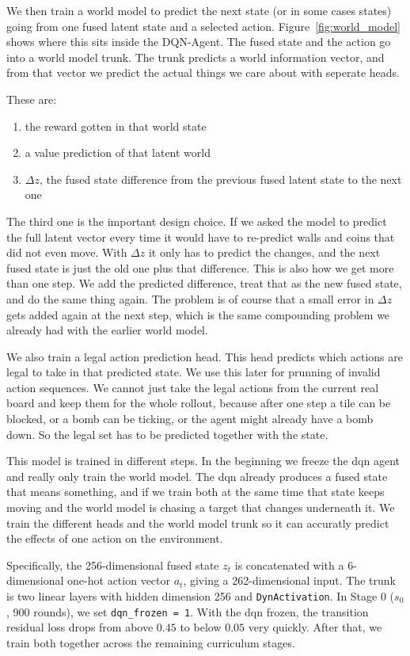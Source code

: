 \documentclass[article, 10pt]{IEEEtran}
\begin{document}
We then train a world model to predict the next state (or in some cases states) going from one fused latent state and a selected action. Figure~\ref{fig:world_model} shows where this sits inside the DQN-Agent. The fused state and the action go into a world model trunk. The trunk predicts a world information vector, and from that vector we predict the actual things we care about with seperate heads.

These are:
\begin{enumerate}
    \item the reward gotten in that world state
    \item a value prediction of that latent world
    \item $\Delta z$, the fused state difference from the previous fused latent state to the next one
\end{enumerate}

The third one is the important design choice. If we asked the model to predict the full latent vector every time it would have to re-predict walls and coins that did not even move. With $\Delta z$ it only has to predict the changes, and the next fused state is just the old one plus that difference. This is also how we get more than one step. We add the predicted difference, treat that as the new fused state, and do the same thing again. The problem is of course that a small error in $\Delta z$ gets added again at the next step, which is the same compounding problem we already had with the earlier world model.

We also train a legal action prediction head. This head predicts which actions are legal to take in that predicted state. We use this later for prunning of invalid action sequences. We cannot just take the legal actions from the current real board and keep them for the whole rollout, because after one step a tile can be blocked, or a bomb can be ticking, or the agent might already have a bomb down. So the legal set has to be predicted together with the state.

This model is trained in different steps. In the beginning we freeze the dqn agent and really only train the world model. The dqn already produces a fused state that means something, and if we train both at the same time that state keeps moving and the world model is chasing a target that changes underneath it. We train the different heads and the world model trunk so it can accuratly predict the effects of one action on the environment.

Specifically, the 256-dimensional fused state $z_t$ is concatenated with a 6-dimensional one-hot action vector $a_t$, giving a 262-dimensional input. The trunk is two linear layers with hidden dimension 256 and \texttt{DynActivation}. In Stage 0 ($s_0$, 900 rounds), we set \texttt{dqn\_frozen = 1}. With the dqn frozen, the transition residual loss drops from above $0.45$ to below $0.05$ very quickly. After that, we train both together across the remaining curriculum stages.
\end{document}
